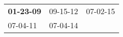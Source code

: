 \begin{supertabular}{p{0.33\columnwidth}p{0.33\columnwidth}p{0.33\columnwidth}}
 \textbf{01-23-09\textsuperscript{}} &  09-15-12\textsuperscript{} &  07-02-15\textsuperscript{} \\
          07-04-11\textsuperscript{} &  07-04-14\textsuperscript{} &                             \\
\end{supertabular}
